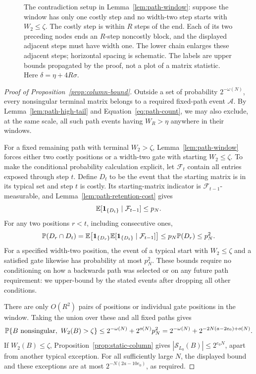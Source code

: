 \begin{figure}[tbp]
\centering

\caption{The contradiction setup in Lemma~\ref{lem:path-window}:
suppose the window has only one costly step and no width-two step
starts with \(W_2\le\zeta\). The costly step is within \(R\)
steps of the end. Each of its two preceding nodes ends an \(R\)-step
noncostly block, and the displayed adjacent steps must have width
one. The lower chain enlarges these adjacent steps; horizontal
spacing is schematic. The labels are upper bounds propagated by
the proof, not a plot of a matrix statistic.
Here \(\delta=\eta+4R\sigma\).}
\label{fig:terminal-window}
\end{figure}

\begin{proof}[Proof of Proposition~\ref{prop:column-bound}]
Outside a set of probability \(2^{-\omega(N)}\), every nonsingular
terminal matrix belongs to a required fixed-path event \(\mathcal A\).
By Lemma~\ref{lem:path-high-tail} and Equation~\eqref{eq:path-count},
we may also exclude, at the same scale, all such path events having
\(W_R>\eta\) anywhere in their windows.

For a fixed remaining path with terminal \(W_2>\zeta\),
Lemma~\ref{lem:path-window} forces either two costly positions or
a width-two gate with starting \(W_2\le\zeta\). To make the
conditional probability calculation explicit, let \(\mathcal F_t\)
contain all entries exposed through step \(t\). Define \(D_t\)
to be the event that the starting matrix is in its typical set and
step \(t\) is costly. Its starting-matrix indicator is
\(\mathcal F_{t-1}\)-measurable, and
Lemma~\ref{lem:path-retention-cost} gives
\[
 \mathbb E[\mathbf 1_{\{D_t\}}\mid\mathcal F_{t-1}]\le p_N.
\]
For any two positions \(r<t\), including consecutive ones,
\begin{equation}\label{eq:path-two-positions}
 \mathbb P(D_r\cap D_t)
 =\mathbb E\!\left[\mathbf 1_{\{D_r\}}
       \mathbb E[\mathbf 1_{\{D_t\}}\mid\mathcal F_{t-1}]\right]
 \le p_N\mathbb P(D_r)\le p_N^2.
\end{equation}
For a specified width-two position, the event of a typical start
with \(W_2\le\zeta\) and a satisfied gate likewise has probability
at most \(p_N^2\). These bounds require no conditioning on how a
backwards path was selected or on any future path requirement: we
upper-bound by the stated events after dropping all other conditions.

There are only \(O(R^2)\) pairs of positions or individual gate
positions in the window. Taking the union over these and all fixed
paths gives
\[
 \mathbb P\{B\text{ nonsingular},\ W_2(B)>\zeta\}
 \le2^{-\omega(N)}+2^{o(N)}p_N^2
 =2^{-\omega(N)}+2^{-2N(a-2e_0)+o(N)}.
\]
If \(W_2(B)\le\zeta\), Proposition~\ref{prop:static-column}
gives \(|\mathcal S_{L_0}(B)|\le2^{e_0N}\), apart from another
typical exception. For all sufficiently large \(N\), the displayed
bound and these exceptions are at most \(2^{-N(2a-10e_0)}\),
as required.
\end{proof}
